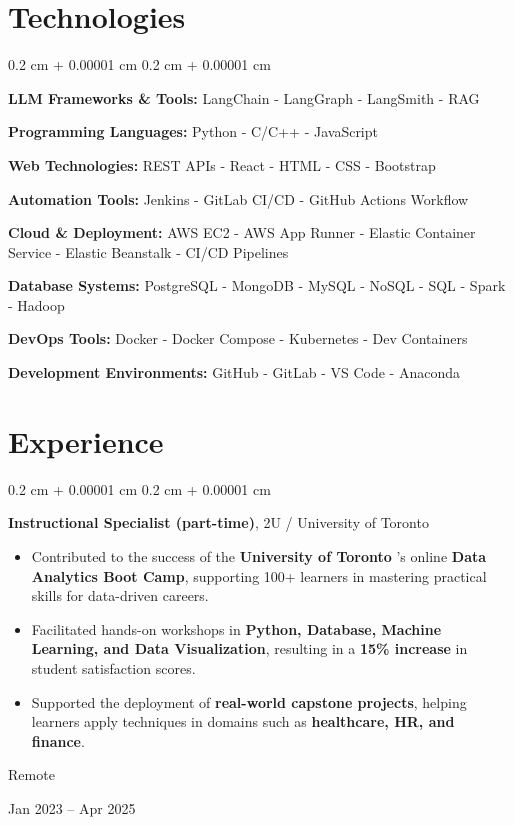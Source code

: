 \documentclass[10pt, letterpaper]{article}
\newenvironment{highlights}{
    \begin{itemize}[
        topsep=0.10 cm,
        parsep=0.10 cm,
        partopsep=0pt,
        itemsep=0pt,
        leftmargin=0.4 cm + 10pt
    ]
}{
    \end{itemize}
} %
\newenvironment{onecolentry}{
    \begin{adjustwidth}{
        0.2 cm + 0.00001 cm
    }{
        0.2 cm + 0.00001 cm
    }
}{
    \end{adjustwidth}
} %
\newenvironment{twocolentry}[2][]{
    \onecolentry
    \def\secondColumn{#2}
    \setcolumnwidth{\fill, 4.5 cm}
    \begin{paracol}{2}
}{
    \switchcolumn \raggedleft \secondColumn
    \end{paracol}
    \endonecolentry
} %
\let\hrefWithoutArrow\href
\renewcommand{\href}[2]{\hrefWithoutArrow{#1}{\ifthenelse{\equal{#2}{}}{ }{#2 }\raisebox{.15ex}{\footnotesize \faExternalLink*}}}
\begin{document}
        \vspace{-0.3 cm}

\section{Technologies}
\vspace{-0.5cm}
\begin{onecolentry}
\item \textbf{LLM Frameworks \& Tools:} LangChain - LangGraph - LangSmith - RAG
\item \textbf{Programming Languages:} Python - C/C++ - JavaScript
\item \textbf{Web Technologies:} REST APIs - React - HTML - CSS - Bootstrap
\item \textbf{Automation Tools:} Jenkins - GitLab CI/CD - GitHub Actions Workflow
\item \textbf{Cloud \& Deployment:} AWS EC2 - AWS App Runner - Elastic Container Service - Elastic Beanstalk - CI/CD Pipelines
\item \textbf{Database Systems:} PostgreSQL - MongoDB - MySQL - NoSQL - SQL - Spark - Hadoop 
\item \textbf{DevOps Tools:} Docker - Docker Compose - Kubernetes - Dev Containers
\item \textbf{Development Environments:} GitHub - GitLab - VS Code - Anaconda
\end{onecolentry}

        
\vspace{-0.2 cm}
\section{Experience}



\begin{twocolentry}{
    Remote

    Jan 2023 – Apr 2025
}
    \textbf{Instructional Specialist (part-time)}, 2U / University of Toronto

    \begin{highlights}
        \item Contributed to the success of the \textbf{University of Toronto} 's online \textbf{Data Analytics Boot Camp}, supporting 100+ learners in mastering practical skills for data-driven careers.
        \item Facilitated hands-on workshops in \textbf{Python, Database, Machine Learning, and Data Visualization}, resulting in a \textbf{15\% increase} in student satisfaction scores.
        \item Supported the deployment of \textbf{real-world capstone projects}, helping learners apply techniques in domains such as \textbf{healthcare, HR, and finance}.
    \end{highlights}
\end{twocolentry}
\end{document}
